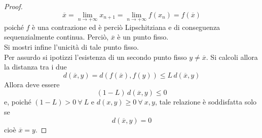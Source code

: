 \begin{proof}
\begin{equation}
        \overline{x}= \lim_{n \to +\infty}{x_{n+1}}=\lim_{n \to +\infty}{f(x_n)} = f(\overline{x})
    \end{equation}
    poiché $f$ è una contrazione ed è perciò Lipschitziana e di conseguenza sequenzialmente continua. Perciò, $\overline{x}$ è un punto fisso.\\
    Si mostri infine l'unicità di tale punto fisso.\\
    Per assurdo si ipotizzi l'esistenza di un secondo punto fisso $y \neq \overline{x}$. Si calcoli allora la distanza tra i due
    \begin{equation}
        d(\overline{x}, y)= d(f(\overline{x}), f(y)) \leq L\, d(\overline{x}, y)
    \end{equation}
    Allora deve essere 
    \begin{equation}
        (1-L)\, d(\overline{x}, y) \leq 0
    \end{equation}
    e, poiché $(1-L)>0\ \forall\ L$ e $d(x, y) \geq 0\ \forall\ x,y$, tale relazione è soddisfatta solo se
    \begin{equation}
        d(\overline{x}, y)=0
    \end{equation}
    cioè $\overline{x}=y$.
\end{proof}